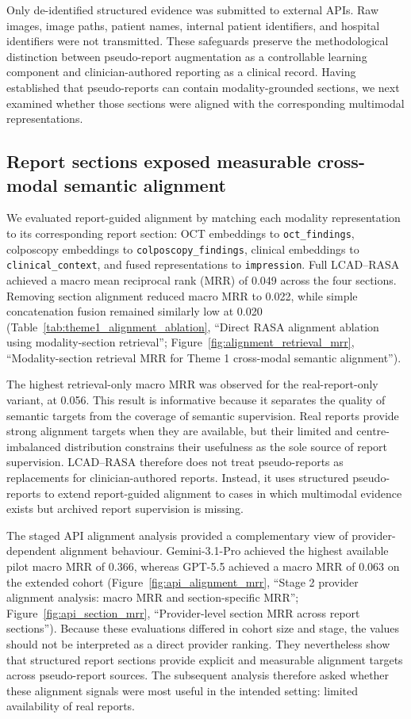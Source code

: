 Only de-identified structured evidence was submitted to external APIs. Raw images, image paths, patient names, internal patient identifiers, and hospital identifiers were not transmitted. These safeguards preserve the methodological distinction between pseudo-report augmentation as a controllable learning component and clinician-authored reporting as a clinical record. Having established that pseudo-reports can contain modality-grounded sections, we next examined whether those sections were aligned with the corresponding multimodal representations.

\subsection{Report sections exposed measurable cross-modal semantic alignment}
\label{subsec:alignment_results}

We evaluated report-guided alignment by matching each modality representation to its corresponding report section: OCT embeddings to \texttt{oct\_findings}, colposcopy embeddings to \texttt{colposcopy\_findings}, clinical embeddings to \texttt{clinical\_context}, and fused representations to \texttt{impression}. Full LCAD--RASA achieved a macro mean reciprocal rank (MRR) of 0.049 across the four sections. Removing section alignment reduced macro MRR to 0.022, while simple concatenation fusion remained similarly low at 0.020 (Table~\ref{tab:theme1_alignment_ablation}, ``Direct RASA alignment ablation using modality-section retrieval''; Figure~\ref{fig:alignment_retrieval_mrr}, ``Modality-section retrieval MRR for Theme 1 cross-modal semantic alignment'').

The highest retrieval-only macro MRR was observed for the real-report-only variant, at 0.056. This result is informative because it separates the quality of semantic targets from the coverage of semantic supervision. Real reports provide strong alignment targets when they are available, but their limited and centre-imbalanced distribution constrains their usefulness as the sole source of report supervision. LCAD--RASA therefore does not treat pseudo-reports as replacements for clinician-authored reports. Instead, it uses structured pseudo-reports to extend report-guided alignment to cases in which multimodal evidence exists but archived report supervision is missing.

The staged API alignment analysis provided a complementary view of provider-dependent alignment behaviour. Gemini-3.1-Pro achieved the highest available pilot macro MRR of 0.366, whereas GPT-5.5 achieved a macro MRR of 0.063 on the extended cohort (Figure~\ref{fig:api_alignment_mrr}, ``Stage 2 provider alignment analysis: macro MRR and section-specific MRR''; Figure~\ref{fig:api_section_mrr}, ``Provider-level section MRR across report sections''). Because these evaluations differed in cohort size and stage, the values should not be interpreted as a direct provider ranking. They nevertheless show that structured report sections provide explicit and measurable alignment targets across pseudo-report sources. The subsequent analysis therefore asked whether these alignment signals were most useful in the intended setting: limited availability of real reports.

